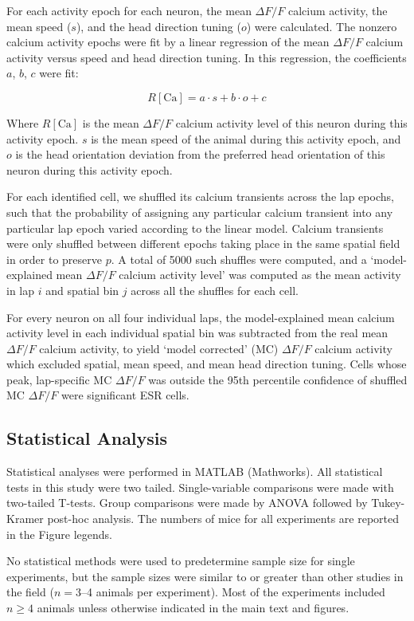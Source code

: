 For each activity epoch for each neuron, the mean $\Delta F/F$ calcium activity, the mean speed ($s$), and the head direction tuning ($o$) were calculated. The nonzero calcium activity epochs were fit by a linear regression of the mean $\Delta F/F$ calcium activity versus speed and head direction tuning. In this regression, the coefficients $a$, $b$, $c$ were fit:

\[
R[\mathrm{Ca}] = a \cdot s + b \cdot o + c
\]

Where $R[\mathrm{Ca}]$ is the mean $\Delta F/F$ calcium activity level of this neuron during this activity epoch. $s$ is the mean speed of the animal during this activity epoch, and $o$ is the head orientation deviation from the preferred head orientation of this neuron during this activity epoch.

For each identified cell, we shuffled its calcium transients across the lap epochs, such that the probability of assigning any particular calcium transient into any particular lap epoch varied according to the linear model. Calcium transients were only shuffled between different epochs taking place in the same spatial field in order to preserve $p$. A total of 5000 such shuffles were computed, and a `model-explained mean $\Delta F/F$ calcium activity level' was computed as the mean activity in lap $i$ and spatial bin $j$ across all the shuffles for each cell.

For every neuron on all four individual laps, the model-explained mean calcium activity level in each individual spatial bin was subtracted from the real mean $\Delta F/F$ calcium activity, to yield `model corrected' (MC) $\Delta F/F$ calcium activity which excluded spatial, mean speed, and mean head direction tuning. Cells whose peak, lap-specific MC $\Delta F/F$ was outside the 95th percentile confidence of shuffled MC $\Delta F/F$ were significant ESR cells.

\subsection{Statistical Analysis}

Statistical analyses were performed in MATLAB (Mathworks). All statistical tests in this study were two tailed. Single-variable comparisons were made with two-tailed T-tests. Group comparisons were made by ANOVA followed by Tukey-Kramer post-hoc analysis. The numbers of mice for all experiments are reported in the Figure legends.

No statistical methods were used to predetermine sample size for single experiments, but the sample sizes were similar to or greater than other studies in the field ($n = 3$--4 animals per experiment). Most of the experiments included $n \geq 4$ animals unless otherwise indicated in the main text and figures.

